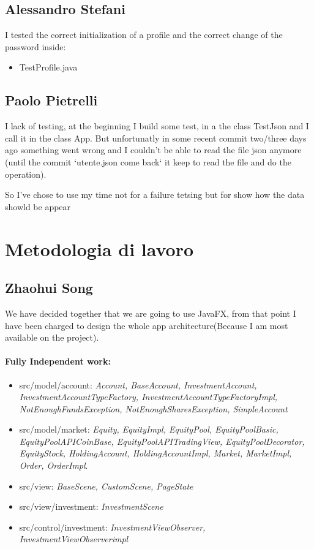 \documentclass[a4paper,12pt]{report}
\begin{document}
\subsection{Alessandro Stefani}
I tested the correct initialization of a profile and the correct change of the password inside:
\begin{itemize}
    \item TestProfile.java
\end{itemize}

\subsection{Paolo Pietrelli}
I lack of testing, at the beginning I build some test, in a the class TestJson and I call it in the class App.
But unfortunatly in some recent commit two/three days ago something went wrong and I couldn't be able to read the file json anymore (until the commit `utente.json come back` it keep to read the file and do the operation).

So I've chose to use my time not for a failure tetsing but for show how the data showld be appear 

\section{Metodologia di lavoro}
\subsection{Zhaohui Song}
We have decided together that we are going to use JavaFX, from that point I have been charged to design the whole app architecture(Because I am most available on the project).
\paragraph*{Fully Independent work:}
\begin{itemize}
    \item src/model/account: \textit{Account, BaseAccount, InvestmentAccount, 
    InvestmentAccountTypeFactory, InvestmentAccountTypeFactoryImpl, NotEnoughFundsException, NotEnoughSharesException, SimpleAccount}
    \item src/model/market: \textit{Equity, EquityImpl, EquityPool, EquityPoolBasic, 
    EquityPoolAPICoinBase, EquityPoolAPITradingView, EquityPoolDecorator, 
    EquityStock, HoldingAccount, HoldingAccountImpl, Market, MarketImpl, Order, OrderImpl}.
    \item src/view: \textit{BaseScene, CustomScene, PageState}
    \item src/view/investment: \textit{InvestmentScene}
    \item src/control/investment: \textit{InvestmentViewObserver, InvestmentViewObserverimpl}
\end{itemize}
\end{document}
